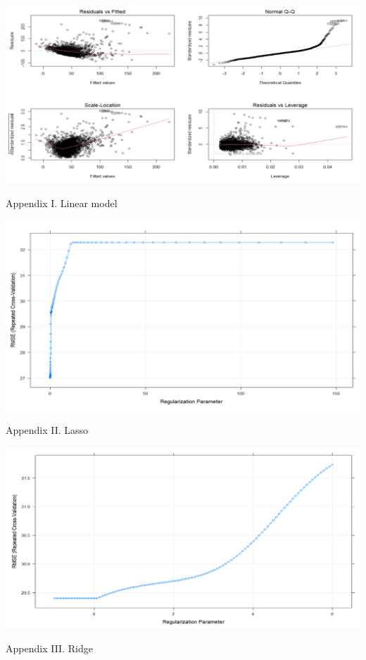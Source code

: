 \documentclass[
]{article}
\begin{document}
\begin{center}\includegraphics[width=0.9\linewidth,height=0.7\textheight]{primary_analysis_plot/linear_plots} \end{center}
\begin{center}
Appendix I. Linear model
\end{center}

\begin{center}\includegraphics[width=0.9\linewidth,height=0.7\textheight]{primary_analysis_plot/lasso_plot} \end{center}
\begin{center}
Appendix II. Lasso
\end{center}

\begin{center}\includegraphics[width=0.9\linewidth,height=0.7\textheight]{primary_analysis_plot/ridge_plot} \end{center}
\begin{center}
Appendix III. Ridge
\end{center}
\end{document}
